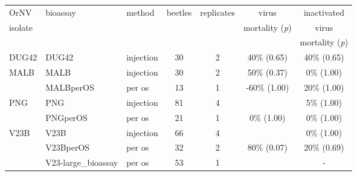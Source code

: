 \documentclass[12pt,letterpaper,english,bibliography=totocnumbered]{scrartcl}
\begin{document}
\begin{table}[h]
\begin{adjustbox}{width=\columnwidth,center}
\begin{threeparttable}
			
	\begin{tabular}{ l l l c c c c }
		\toprule
		OrNV                  & bioassay                                        & method\tnote{1} & beetles & replicates & virus                           & inactivated                     \\
		isolate               &                                                 &                 &         &            & mortality (\textit{p})\tnote{2} & virus                           \\
		                      &                                                 &                 &         &            &                                 & mortality (\textit{p})\tnote{3} \\ \bottomrule
		DUG42                 & DUG42\cite{moore_bioassay_2019}                 & injection       & 30      & 2          & 40\% (0.65)                     & 40\% (0.65)                     \\ \midrule
		\multirow{2}{*}{MALB} & MALB\cite{moore_bioassay_2019-6}                & injection       & 30      & 2          & 50\% (0.37)                     & \hphantom{0}0\% (1.00)          \\
		                      & MALBperOS\cite{moore_bioassay_2019-7}           & per os          & 13      & 1          & -60\% (1.00)                    & 20\% (1.00)                     \\ \midrule
		\multirow{2}{*}{PNG}  & PNG\cite{moore_bioassay_2019-2}                 & injection       & 81      & 4          & \cellcolor{yellow}{90\% (0.00)} & \hphantom{0}5\% (1.00)          \\
		                      & PNGperOS\cite{moore_bioassay_2019-9}            & per os          & 21      & 1          & \hphantom{0}0\% (1.00)          & \hphantom{0} 0\% (1.00)         \\ \midrule
		\multirow{4}{*}{V23B} & V23B\cite{moore_bioassay_2019-3}                & injection       & 66      & 4          & \cellcolor{yellow}{88\% (0.00)} & \hphantom{0}0\% (1.00)          \\
		                      & V23BperOS\cite{moore_bioassay_2019-5}           & per os          & 32      & 2          & 80\% (0.07)                     & 20\% (0.69)                     \\
		                      & V23-large\_bioassay\cite{moore_bioassay_2019-4} & per os          & 53      & 1          & \cellcolor{yellow}{42\% (0.00)} & -                               \\

\end{tabular}
\end{threeparttable}
\end{adjustbox}
\end{table}
\end{document}

